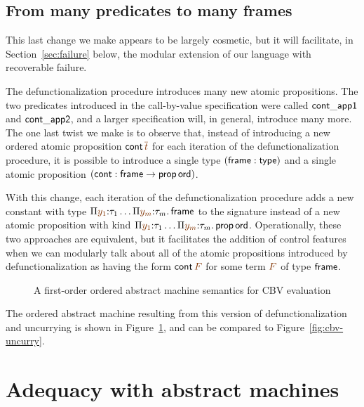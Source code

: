 \subsection{From many predicates to many frames}
\label{sec:defunc-type}

This last change we make appears to be largely cosmetic, but it will
facilitate, in Section~\ref{sec:failure} below, the modular extension
of our language with recoverable failure.

The defunctionalization procedure introduces many new atomic
propositions. The two predicates introduced in the call-by-value
specification were called ${\sf cont\_app1}$ and ${\sf cont\_app2}$,
and a larger specification will, in general, introduce many more.  The
one last twist we make is to observe that, instead of introducing a
new ordered atomic proposition ${\sf cont}\,\lf{\overline{t}}$ for each
iteration of the defunctionalization procedure, it is possible to
introduce a single type $({\sf frame} : {\sf type})$ and a single
atomic proposition $({\sf cont} : {\sf frame} \rightarrow {\sf
  prop\,ord})$.

With this change, each iteration of the defunctionalization
procedure adds a new constant with type $\Pi \lf{y_1}{:}\tau_1\ldots
\Pi \lf{y_m}{:}\tau_m.\, {\sf frame}$ to the signature instead of a 
new atomic proposition
with kind $\Pi \lf{y_1}{:}\tau_1\ldots \Pi \lf{y_m}{:}\tau_m.\, {\sf
  prop\,ord}$.  Operationally, these two approaches are equivalent, but
it facilitates the addition of control features when we can 
modularly talk about all of the atomic propositions introduced
by defunctionalization as having the form ${\sf cont}\,\lf{F}$ for
some term $\lf{F}$ of type ${\sf frame}$.

\begin{figure}
\caption{A first-order ordered abstract machine semantics for CBV
  evaluation}
\label{fig:cbv-ev-ssos-fun}
\end{figure}

The ordered abstract machine resulting from this version of
defunctionalization and uncurrying is shown in
Figure~\ref{fig:cbv-ev-ssos-fun}, and can be compared to
Figure~\ref{fig:cbv-uncurry}.

\section{Adequacy with abstract machines}
\label{sec:nat-ssos-adequacy}

